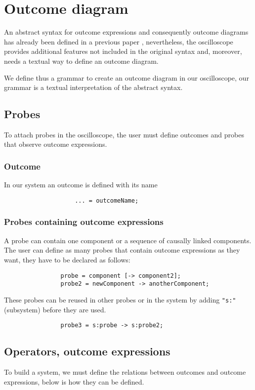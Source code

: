   \section{Outcome diagram}
        An abstract syntax for outcome expressions and consequently outcome diagrams has already been defined in a previous paper \cite{art}, nevertheless, the oscilloscope provides additional features not included in the original syntax and, moreover, needs a textual way to define an outcome diagram. 
       
        We define thus a grammar to create an outcome diagram in our oscilloscope, our grammar is a textual interpretation of the abstract syntax.
        \subsection{Probes}
            To attach probes in the oscilloscope, the user must define outcomes and probes that observe outcome expressions.
            \subsubsection{Outcome}
                In our system an outcome is defined with its name
                \begin{verbatim}
                    ... = outcomeName;
                \end{verbatim}
        
        \subsubsection{Probes containing outcome expressions}
            A probe can contain one component or a sequence of causally linked components.
            The user can define as many probes that contain outcome expressions as they want, they have to be declared as follows:
            \begin{verbatim}
                probe = component [-> component2];
                probe2 = newComponent -> anotherComponent;
            \end{verbatim}
    
            These probes can be reused in other probes or in the system by adding \texttt{"s:"} (subsystem) before they are used.
            \begin{verbatim}
                probe3 = s:probe -> s:probe2;
            \end{verbatim}
 
        \subsection{Operators, outcome expressions}
            To build a system, we must define the relations between outcomes and outcome expressions, below is how they can be defined. 

